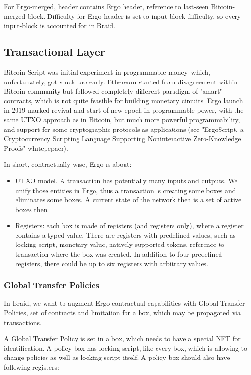 \documentclass{llncs}   %
\begin{document}
For Ergo-merged, header contains Ergo header, reference to last-seen Bitcoin-merged block. Difficulty for Ergo header is set to input-block difficulty, so every input-block is accounted for in Braid. 


\subsection{Transactional Layer}

Bitcoin Script was initial experiment in programmable money, which, unfortunately, got stuck too early. Ethereum started from disagreement
within Bitcoin community but followed completely different paradigm of "smart" contracts, which is not quite feasible for building monetary circuits. Ergo launch in 2019 marked revival and start of new epoch in programmable power, with the same UTXO approach as in Bitcoin, but much more powerful programmability, and support for some cryptographic protocols as applications (see "ErgoScript, a Cryptocurrency Scripting Language Supporting Noninteractive Zero-Knowledge Proofs" whitepepaer).

In short, contractually-wise, Ergo is about:

\begin{itemize}
  \item UTXO model. A transaction has potentially many inputs and outputs. We unify those entities in Ergo, thus a transaction is creating some boxes and eliminates some boxes. A current state of the network then is a set of active boxes then.
  \item Registers: each box is made of registers (and registers only), where a register contains a typed value. There are registers with predefined values, such as locking script, monetary value, natively supported tokens, reference to transaction where the box was created. In addition to four predefined registers, there could be up to six registers with arbitrary values.
\end{itemize}

\subsubsection{Global Transfer Policies}

In Braid, we want to augment Ergo contractual capabilities with Global Transfer Policies, set of contracts and limitation for a box, which may be propagated via transactions.

A Global Transfer Policy is set in a box, which needs to have a special NFT for identification. A policy box has locking script, like every box, which is allowing to change policies as well as locking script itself. A policy box should also have following registers:
\end{document}
